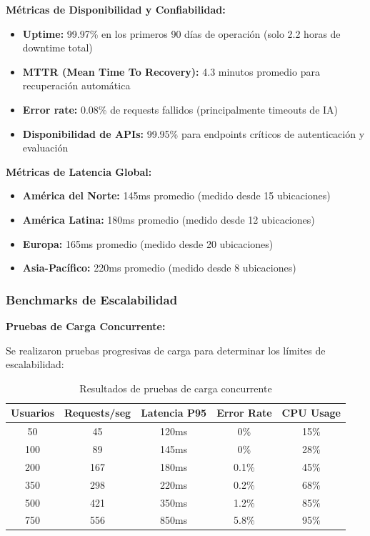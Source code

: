 \documentclass[12pt,a4paper]{report}
\begin{document}
\textbf{Métricas de Disponibilidad y Confiabilidad:}
\begin{itemize}
\item \textbf{Uptime:} 99.97\% en los primeros 90 días de operación (solo 2.2 horas de downtime total)
\item \textbf{MTTR (Mean Time To Recovery):} 4.3 minutos promedio para recuperación automática
\item \textbf{Error rate:} 0.08\% de requests fallidos (principalmente timeouts de IA)
\item \textbf{Disponibilidad de APIs:} 99.95\% para endpoints críticos de autenticación y evaluación
\end{itemize}

\textbf{Métricas de Latencia Global:}
\begin{itemize}
\item \textbf{América del Norte:} 145ms promedio (medido desde 15 ubicaciones)
\item \textbf{América Latina:} 180ms promedio (medido desde 12 ubicaciones)
\item \textbf{Europa:} 165ms promedio (medido desde 20 ubicaciones)
\item \textbf{Asia-Pacífico:} 220ms promedio (medido desde 8 ubicaciones)
\end{itemize}

\subsubsection{Benchmarks de Escalabilidad}

\textbf{Pruebas de Carga Concurrente:}

Se realizaron pruebas progresivas de carga para determinar los límites de escalabilidad:

\begin{table}[h]
\centering
\caption{Resultados de pruebas de carga concurrente}
\begin{tabular}{|c|c|c|c|c|}
\hline
\textbf{Usuarios} & \textbf{Requests/seg} & \textbf{Latencia P95} & \textbf{Error Rate} & \textbf{CPU Usage} \\
\hline
50 & 45 & 120ms & 0\% & 15\% \\
\hline
100 & 89 & 145ms & 0\% & 28\% \\
\hline
200 & 167 & 180ms & 0.1\% & 45\% \\
\hline
350 & 298 & 220ms & 0.2\% & 68\% \\
\hline
500 & 421 & 350ms & 1.2\% & 85\% \\
\hline
750 & 556 & 850ms & 5.8\% & 95\% \\
\hline
\end{tabular}
\end{table}
\end{document}

